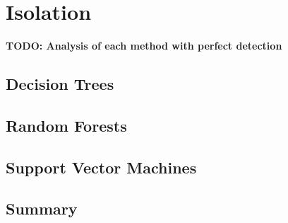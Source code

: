 \chapter{Isolation}
\label{chap:Isolation}

\textbf{TODO: Analysis of each method with perfect detection}

\section{Decision Trees}

\section{Random Forests}

\section{Support Vector Machines}

\section{Summary}
